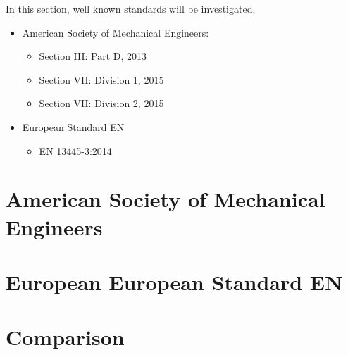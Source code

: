 
In this section, well known standards will be investigated.

\begin{itemize}
    \item American Society of Mechanical Engineers:
	    \begin{itemize}
	       	\item Section III: Part D, 2013	\citep{ASMEbvpcIID}
	    	\item Section VII: Division 1, 2015 \citep{ASMEbvpcVII1}
	    	\item Section VII: Division 2, 2015 \citep{ASMEbvpcVII2}
	    \end{itemize}
    \item European Standard EN
        \begin{itemize}
	       	\item EN 13445-3:2014
	    \end{itemize}
\end{itemize}

\section{American Society of Mechanical Engineers}

\section{European European Standard EN}

\section{Comparison}

